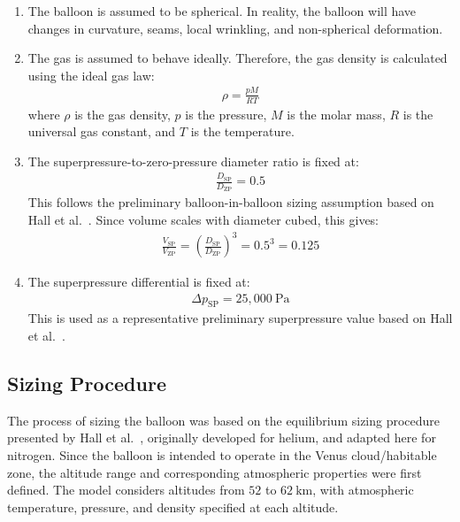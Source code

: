 \begin{enumerate}
    \item The balloon is assumed to be spherical. In reality, the balloon will have changes in curvature, seams, local wrinkling, and non-spherical deformation.
    \item The gas is assumed to behave ideally. Therefore, the gas density is calculated using the ideal gas law:
    \begin{align}
        \rho = \frac{pM}{RT}
    \end{align}
    where $\rho$ is the gas density, $p$ is the pressure, $M$ is the molar mass, $R$ is the universal gas constant, and $T$ is the temperature.
    \item The superpressure-to-zero-pressure diameter ratio is fixed at:
    \begin{align}
        \frac{D_{\mathrm{SP}}}{D_{\mathrm{ZP}}} = 0.5
    \end{align}
    This follows the preliminary balloon-in-balloon sizing assumption based on Hall et al.~\cite{Hall2021}. Since volume scales with diameter cubed, this gives:
    \begin{align}
        \frac{V_{\mathrm{SP}}}{V_{\mathrm{ZP}}} =
        \left(\frac{D_{\mathrm{SP}}}{D_{\mathrm{ZP}}}\right)^3
        = 0.5^3 = 0.125
    \end{align}
    \item The superpressure differential is fixed at:
    \begin{align}
        \Delta p_{\mathrm{SP}} = 25{,}000~\mathrm{Pa}
    \end{align}
    This is used as a representative preliminary superpressure value based on Hall et al.~\cite{Hall2021}.
\end{enumerate}
\subsection{Sizing Procedure}

The process of sizing the balloon was based on the equilibrium sizing procedure presented by Hall et al.~\cite{Hall2021}, originally developed for helium, and adapted here for nitrogen. Since the balloon is intended to operate in the Venus cloud/habitable zone, the altitude range and corresponding atmospheric properties were first defined. The model considers altitudes from $52$ to $62~\mathrm{km}$, with atmospheric temperature, pressure, and density specified at each altitude.


